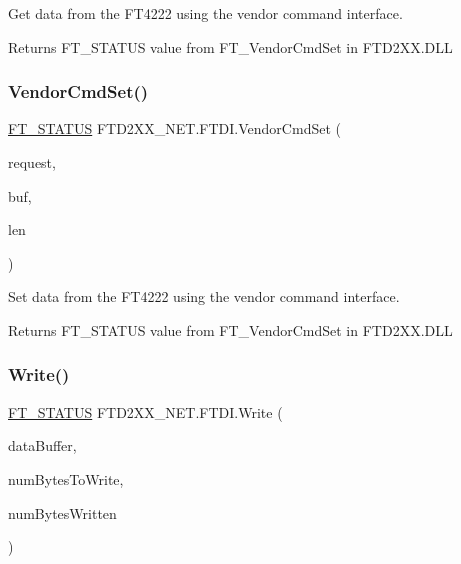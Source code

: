 Get data from the F\+T4222 using the vendor command interface. 

\begin{DoxyReturn}{Returns}
F\+T\+\_\+\+S\+T\+A\+T\+US value from F\+T\+\_\+\+Vendor\+Cmd\+Set in F\+T\+D2\+X\+X.\+D\+LL
\end{DoxyReturn}
\mbox{\label{class_f_t_d2_x_x___n_e_t_1_1_f_t_d_i_ac8eb155b363e5e19269cebe82dd9f411}} 
\subsubsection{\texorpdfstring{VendorCmdSet()}{VendorCmdSet()}}
{\footnotesize\ttfamily \mbox{\hyperlink{class_f_t_d2_x_x___n_e_t_1_1_f_t_d_i_aabe20ad905cc4ccc1e35dd5b877d9a83}{F\+T\+\_\+\+S\+T\+A\+T\+US}} F\+T\+D2\+X\+X\+\_\+\+N\+E\+T.\+F\+T\+D\+I.\+Vendor\+Cmd\+Set (\begin{DoxyParamCaption}\item[{U\+Int16}]{request,  }\item[{byte \mbox{[}$\,$\mbox{]}}]{buf,  }\item[{U\+Int16}]{len }\end{DoxyParamCaption})}



Set data from the F\+T4222 using the vendor command interface. 

\begin{DoxyReturn}{Returns}
F\+T\+\_\+\+S\+T\+A\+T\+US value from F\+T\+\_\+\+Vendor\+Cmd\+Set in F\+T\+D2\+X\+X.\+D\+LL
\end{DoxyReturn}
\mbox{\label{class_f_t_d2_x_x___n_e_t_1_1_f_t_d_i_ae4bf804419aada362d58ac3341a59726}} 
\subsubsection{\texorpdfstring{Write()}{Write()}\hspace{0.1cm}{\footnotesize\ttfamily [1/4]}}
{\footnotesize\ttfamily \mbox{\hyperlink{class_f_t_d2_x_x___n_e_t_1_1_f_t_d_i_aabe20ad905cc4ccc1e35dd5b877d9a83}{F\+T\+\_\+\+S\+T\+A\+T\+US}} F\+T\+D2\+X\+X\+\_\+\+N\+E\+T.\+F\+T\+D\+I.\+Write (\begin{DoxyParamCaption}\item[{byte \mbox{[}$\,$\mbox{]}}]{data\+Buffer,  }\item[{Int32}]{num\+Bytes\+To\+Write,  }\item[{ref U\+Int32}]{num\+Bytes\+Written }\end{DoxyParamCaption})}



